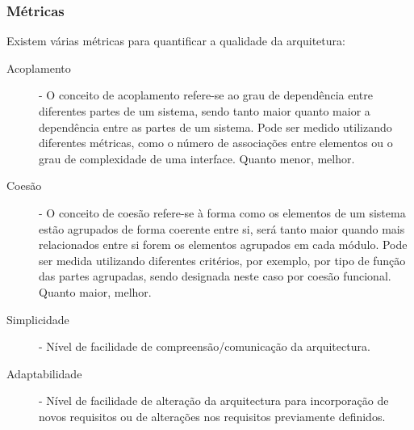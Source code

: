 \documentclass[a4paper,12pt]{article}
\begin{document}
\subsubsection{Métricas}
Existem várias métricas para quantificar a qualidade da arquitetura:
\begin{description}
	\item[Acoplamento] - O conceito de acoplamento refere-se ao grau de dependência entre diferentes partes de um sistema, sendo tanto maior quanto maior a dependência entre as partes de um sistema. Pode ser medido utilizando diferentes métricas, como o número de associações entre elementos ou o grau de complexidade de uma interface. Quanto menor, melhor.
	\item[Coesão] - O conceito de coesão refere-se à forma como os elementos de um sistema estão agrupados de forma coerente entre si, será tanto maior quando mais relacionados entre si forem os elementos agrupados em cada módulo. Pode ser medida utilizando diferentes critérios, por exemplo, por tipo de função das partes agrupadas, sendo designada neste caso por coesão funcional. Quanto maior, melhor.
	\item[Simplicidade] - Nível de facilidade de compreensão/comunicação da arquitectura.
	\item[Adaptabilidade] - Nível de facilidade de alteração da arquitectura para incorporação de novos requisitos ou de alterações nos requisitos previamente definidos.
\end{description}
\end{document}
